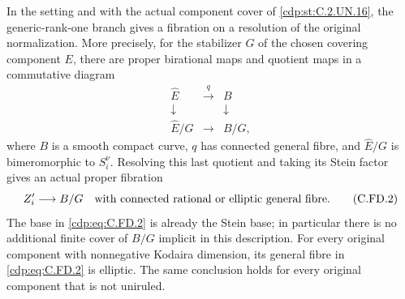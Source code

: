 \begin{proposition}\label{cdp:st:C.2.UN.20}

In the setting and with the actual component cover of \ref{cdp:st:C.2.UN.16},
the generic-rank-one branch gives a fibration on a resolution of
the original normalization. More precisely, for the stabilizer
$G$ of the chosen covering component $E$, there are proper
birational maps and quotient maps in a commutative diagram
\[
\begin{array}{ccc}
 \widehat E&\xrightarrow{\ q\ }&B\\
 \downarrow&&\downarrow\\
 \widehat E/G&\longrightarrow&B/G,
\end{array}                                                    \tag{C.FD.1}\label{cdp:eq:C.FD.1}
\]
where $B$ is a smooth compact curve, $q$ has connected general
fibre, and $\widehat E/G$ is bimeromorphic to $S_i^\nu$.
Resolving this last quotient and taking its Stein factor gives
an actual proper fibration
\[
        Z'_i\longrightarrow B/G
        \quad\hbox{with connected rational or elliptic general fibre}.
                                                               \tag{C.FD.2}\label{cdp:eq:C.FD.2}
\]
The base in \eqref{cdp:eq:C.FD.2} is already the Stein base; in particular
there is no additional finite cover of $B/G$ implicit in this
description. For every original component with nonnegative
Kodaira dimension, its general fibre in \eqref{cdp:eq:C.FD.2} is elliptic.
The same conclusion holds for every original component that
is not uniruled.
\end{proposition}

